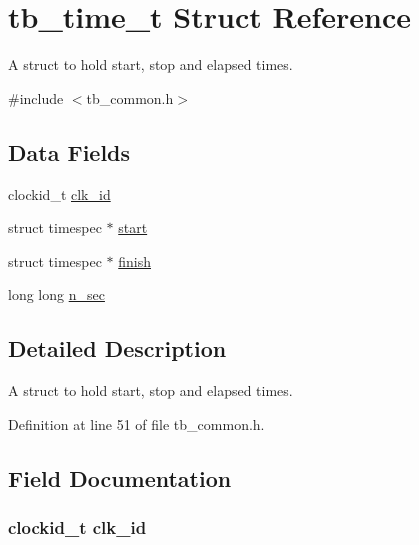 \hypertarget{structtb__time__t}{\section{tb\-\_\-time\-\_\-t Struct Reference}
\label{structtb__time__t}
}


A struct to hold start, stop and elapsed times.  




{\ttfamily \#include $<$tb\-\_\-common.\-h$>$}

\subsection*{Data Fields}
\begin{DoxyCompactItemize}
\item 
clockid\-\_\-t \hyperlink{structtb__time__t_aa8e00f6c852df6521630cfa00531c02d}{clk\-\_\-id}
\item 
struct timespec $\ast$ \hyperlink{structtb__time__t_a300f258f56b552b672396bfbede700a8}{start}
\item 
struct timespec $\ast$ \hyperlink{structtb__time__t_a48fdbc276d8f5d2f81ebe02d2ff62473}{finish}
\item 
long long \hyperlink{structtb__time__t_a8889de00f0d94d229d5549cd57597948}{n\-\_\-sec}
\end{DoxyCompactItemize}


\subsection{Detailed Description}
A struct to hold start, stop and elapsed times. 

Definition at line 51 of file tb\-\_\-common.\-h.



\subsection{Field Documentation}
\hypertarget{structtb__time__t_aa8e00f6c852df6521630cfa00531c02d}{
\subsubsection[{clk\-\_\-id}]{\setlength{\rightskip}{0pt plus 5cm}clockid\-\_\-t clk\-\_\-id}}\label{structtb__time__t_aa8e00f6c852df6521630cfa00531c02d}


